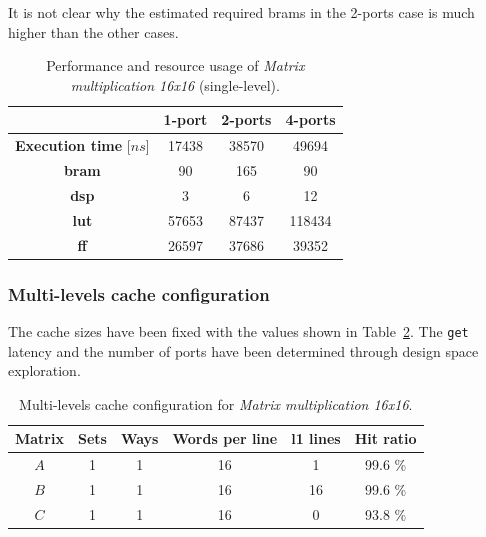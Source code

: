 \documentclass[11pt,a4paper,oneside]{memoir}
\begin{document}
It is not clear why the estimated required \acp{bram} in the 2-ports case is much
higher than the other cases.

\begin{table}[H]
	\begin{center}
		\begin{tabular}{cccc}
			\hline
			\rowcolor{gray!50}
			& \textbf{1-port} & \textbf{2-ports} & \textbf{4-ports} \\
			\hline
			\textbf{Execution time} [$ns$] & 17438 & 38570 & 49694 \\
			\rowcolor{gray!25}
			\textbf{\ac{bram}} & 90 & 165 & 90 \\
			\textbf{\acs{dsp}} & 3 & 6 & 12 \\
			\rowcolor{gray!25}
			\textbf{\acs{lut}} & 57653 & 87437 & 118434 \\
			\textbf{\acs{ff}} & 26597 & 37686 & 39352 \\
			\hline
		\end{tabular}
	\end{center}
	\caption{Performance and resource usage of \emph{Matrix multiplication
	16x16} (single-level).}
	\label{tab:matmul_16_no_l1_ports_report}
\end{table}

\subsubsection{Multi-levels cache configuration}
The cache sizes have been fixed with the values shown in
Table~\ref{tab:matmul_16_l1_config}.
The \texttt{get} latency and the number of ports have been determined through
design space exploration.

\begin{table}[H]
	\begin{center}
		\begin{tabular}{cccccc}
			\hline
			\rowcolor{gray!50}
			\textbf{Matrix} &
			\textbf{Sets} & \textbf{Ways} & \textbf{Words per line} &
			\textbf{\ac{l1} lines} & \textbf{Hit ratio} \\
			\hline
			$A$ & 1 & 1 & 16 & 1 & 99.6 \% \\
			\rowcolor{gray!25}
			$B$ & 1 & 1 & 16 & 16 & 99.6 \% \\
			$C$ & 1 & 1 & 16 & 0 & 93.8 \% \\
			\hline
		\end{tabular}
	\end{center}
	\caption{Multi-levels cache configuration for \emph{Matrix
	multiplication 16x16}.}
	\label{tab:matmul_16_l1_config}
\end{table}
\end{document}
